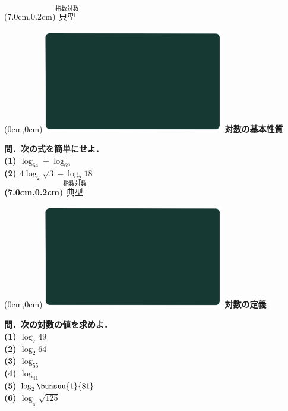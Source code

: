 \documentclass[10pt,
fleqn,
dvipdfmx,
uplatex
]{jsarticle}
\begin{document}
\at(7.0cm,0.2cm){\small\color{bradorange}$\overset{\text{指数対数}}{\text{典型}}$}


\newpage



\at(0cm,0cm){\includegraphics[width=8cm,bb=0 0 1920 1080]{./youtube/thumbnails/templates/smart_background/指数対数.jpeg}}
{\color{orange}\bf\boldmath\huge\underline{対数の基本性質}}\vspace{0.3zw}

\Large 
\bf\boldmath 問．次の式を簡単にせよ．\\
(1)  $\log _64+\log _69$\\
(2)  $4\log _2\sqrt 3-\log _2{18}$\\

\at(7.0cm,0.2cm){\small\color{bradorange}$\overset{\text{指数対数}}{\text{典型}}$}


\newpage



\at(0cm,0cm){\includegraphics[width=8cm,bb=0 0 1920 1080]{./youtube/thumbnails/templates/smart_background/指数対数.jpeg}}
{\color{orange}\bf\boldmath\huge\underline{対数の定義}}\vspace{0.3zw}

\normalsize 
\bf\boldmath 問．次の対数の値を求めよ．\\
(1)  $\log _7{49}$\\
(2)  $\log _2{64}$\\
(3)  $\log _55$\\
(4)  $\log _41$\\
(5)  $\log _2\bunsuu{1}{{}81}$\\
(6)  $\log _{\frac{1}{5}}\sqrt {125}$\\
\end{document}
